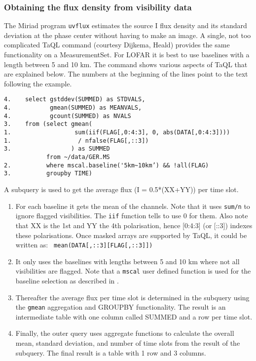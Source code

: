 \subsubsection{Obtaining the flux density from visibility data}
The Miriad program \texttt{uvflux} estimates the source I flux density and its standard deviation at the phase center without having to make an image. 
A single, not too complicated TaQL command (courtesy Dijkema, Heald)
provides the same functionality on a MeasurementSet. 
For LOFAR it is best to use baselines with a length between 5 and 10 km.
The command shows various aspects of TaQL that are explained below. 
The numbers at the beginning of the lines point to the text following
the example. 
\begin{verbatim}
4.    select gstddev(SUMMED) as STDVALS,
4.           gmean(SUMMED) as MEANVALS,
4.           gcount(SUMMED) as NVALS
3.    from (select gmean(
1.                  sum(iif(FLAG[,0:4:3], 0, abs(DATA[,0:4:3])))
1.                   / nfalse(FLAG[,::3])
3.                 ) as SUMMED
            from ~/data/GER.MS
2.          where mscal.baseline('5km~10km’) && !all(FLAG)
3.          groupby TIME)
\end{verbatim}
A subquery is used to get the average flux (I = 0.5*(XX+YY)) per time
slot.
\begin{enumerate}
\item For each baseline it gets the mean of the channels. Note that it 
  uses \texttt{sum/n} to ignore flagged visibilities. The \texttt{iif} function
  tells to use 0 for them. Also note that XX is the 1st and YY the 4th
  polarisation, hence [0:4:3] (or [::3]) indexes these polarisations. 
  Once masked arrays are supported by TaQL, it could be written as:
  \texttt{  mean(DATA[,::3][FLAG[,::3]])}
\item It only uses the baselines with lengths between 5 and 10 km
  where not all visibilities are flagged. Note that a \texttt{mscal}
  user defined function is used for the baseline selection as described
  in .
\item Thereafter the average flux per time slot is determined in the
  subquery using the \texttt{gmean} aggregation and GROUPBY functionality. The
  result is an intermediate table with one column called SUMMED and a row per time slot. 
\item Finally, the outer query uses aggregate functions to calculate
  the overall mean, standard deviation, and number of time slots from
  the result of the subquery. The
  final result is a table with 1 row and 3 columns. 
\end{enumerate}

